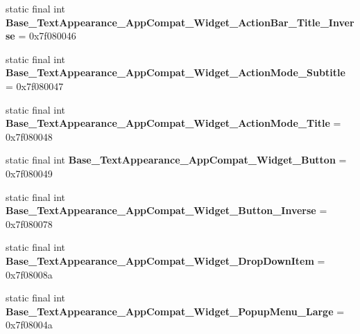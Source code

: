 \begin{DoxyCompactItemize}
\item 
\hypertarget{classandroid_1_1support_1_1design_1_1_r_1_1style_adbb28d8e89e3fb18c87e64d10b2a224e}{}static final int {\bfseries Base\+\_\+\+Text\+Appearance\+\_\+\+App\+Compat\+\_\+\+Widget\+\_\+\+Action\+Bar\+\_\+\+Title\+\_\+\+Inverse} = 0x7f080046\label{classandroid_1_1support_1_1design_1_1_r_1_1style_adbb28d8e89e3fb18c87e64d10b2a224e}

\item 
\hypertarget{classandroid_1_1support_1_1design_1_1_r_1_1style_a220c2b93853663f129a3a4fed0f413ac}{}static final int {\bfseries Base\+\_\+\+Text\+Appearance\+\_\+\+App\+Compat\+\_\+\+Widget\+\_\+\+Action\+Mode\+\_\+\+Subtitle} = 0x7f080047\label{classandroid_1_1support_1_1design_1_1_r_1_1style_a220c2b93853663f129a3a4fed0f413ac}

\item 
\hypertarget{classandroid_1_1support_1_1design_1_1_r_1_1style_a2ac186a582133b18d51ae89caf3ea5db}{}static final int {\bfseries Base\+\_\+\+Text\+Appearance\+\_\+\+App\+Compat\+\_\+\+Widget\+\_\+\+Action\+Mode\+\_\+\+Title} = 0x7f080048\label{classandroid_1_1support_1_1design_1_1_r_1_1style_a2ac186a582133b18d51ae89caf3ea5db}

\item 
\hypertarget{classandroid_1_1support_1_1design_1_1_r_1_1style_ae167becff54797daa37aa8e81fc5d6c8}{}static final int {\bfseries Base\+\_\+\+Text\+Appearance\+\_\+\+App\+Compat\+\_\+\+Widget\+\_\+\+Button} = 0x7f080049\label{classandroid_1_1support_1_1design_1_1_r_1_1style_ae167becff54797daa37aa8e81fc5d6c8}

\item 
\hypertarget{classandroid_1_1support_1_1design_1_1_r_1_1style_a9b290b654323f5f57c9e29efda48226f}{}static final int {\bfseries Base\+\_\+\+Text\+Appearance\+\_\+\+App\+Compat\+\_\+\+Widget\+\_\+\+Button\+\_\+\+Inverse} = 0x7f080078\label{classandroid_1_1support_1_1design_1_1_r_1_1style_a9b290b654323f5f57c9e29efda48226f}

\item 
\hypertarget{classandroid_1_1support_1_1design_1_1_r_1_1style_a4f75f7f5cd1a8bfff243fcd33f3dc6fc}{}static final int {\bfseries Base\+\_\+\+Text\+Appearance\+\_\+\+App\+Compat\+\_\+\+Widget\+\_\+\+Drop\+Down\+Item} = 0x7f08008a\label{classandroid_1_1support_1_1design_1_1_r_1_1style_a4f75f7f5cd1a8bfff243fcd33f3dc6fc}

\item 
\hypertarget{classandroid_1_1support_1_1design_1_1_r_1_1style_ac73eb9fb932bb8b622db57a9f16b18e2}{}static final int {\bfseries Base\+\_\+\+Text\+Appearance\+\_\+\+App\+Compat\+\_\+\+Widget\+\_\+\+Popup\+Menu\+\_\+\+Large} = 0x7f08004a\label{classandroid_1_1support_1_1design_1_1_r_1_1style_ac73eb9fb932bb8b622db57a9f16b18e2}


\end{DoxyCompactItemize}
